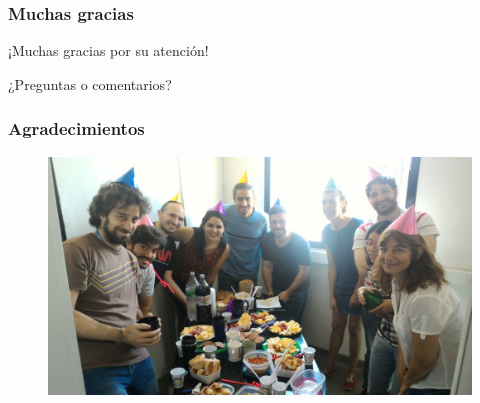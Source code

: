 \documentclass[serif,9pt, t]{beamer}
\begin{document}
\begin{frame}\frametitle{Muchas gracias}
\huge
\centering
¡Muchas gracias por su atención!

\vspace{50pt}
¿Preguntas o comentarios?

\end{frame}

\begin{frame}\frametitle{Agradecimientos}
\begin{figure}
\centering
\includegraphics[width=1\textwidth]{grupo.jpeg}
\end{figure}
\end{frame}
\end{document}
